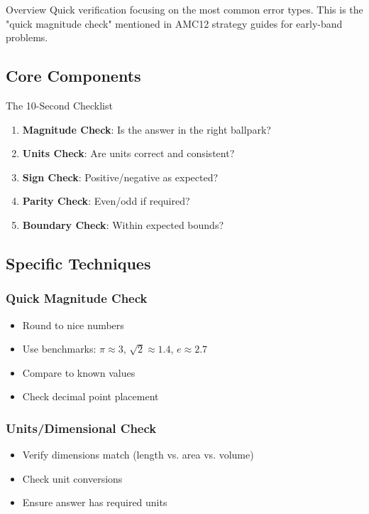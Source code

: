 \documentclass{article}
\begin{document}
\begin{minimalbox}{Overview}
Quick verification focusing on the most common error types. This is the "quick magnitude check" mentioned in AMC12 strategy guides for early-band problems.
\end{minimalbox}

\subsection{Core Components}

\begin{minimalbox}{The 10-Second Checklist}
\begin{enumerate}[nosep]
\item \textbf{Magnitude Check}: Is the answer in the right ballpark?
\item \textbf{Units Check}: Are units correct and consistent?
\item \textbf{Sign Check}: Positive/negative as expected?
\item \textbf{Parity Check}: Even/odd if required?
\item \textbf{Boundary Check}: Within expected bounds?
\end{enumerate}
\end{minimalbox}

\subsection{Specific Techniques}

\subsubsection{Quick Magnitude Check}
\begin{itemize}
\item Round to nice numbers
\item Use benchmarks: $\pi \approx 3$, $\sqrt{2} \approx 1.4$, $e \approx 2.7$
\item Compare to known values
\item Check decimal point placement
\end{itemize}

\subsubsection{Units/Dimensional Check}
\begin{itemize}
\item Verify dimensions match (length vs. area vs. volume)
\item Check unit conversions
\item Ensure answer has required units
\end{itemize}
\end{document}
